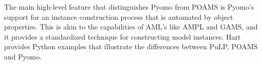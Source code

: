 The main high-level feature that distinguishes Pyomo from POAMS is Pyomo's support for an
instance construction process that is automated by object properties.
This is akin to the capabilities of AML's like AMPL and GAMS, and it
provides a standardized technique for constructing model instances.
Hart~\citep{Har09a} provides Python examples that illustrate
the differences between PuLP, POAMS and Pyomo.


